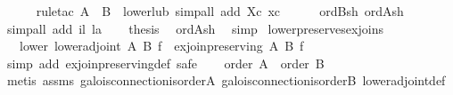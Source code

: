 \begin{isabellebody}
\ \ \ \ \isamarkupfalse%
\ {}rule{}tac\ {}A\ {}\ {}B{}{}\ \ lower{}lub{}\ simp{}all\ add{}\ Xc\ xc{}\isanewline
\ \ \ \ \isamarkupfalse%
\ ord{}Bsh\ ord{}Ash\ \isamarkupfalse%
\ {}simp{}all\ add{}\ il\ la{}\isanewline
\isanewline
\ \ \isamarkupfalse%
\ {}thesis\ \isamarkupfalse%
\ ord{}Ash\ \isamarkupfalse%
\ simp\isanewline
{}\isamarkupfalse%
%
\endisatagproof
{\isafoldproof}%
%
\isadelimproof
\isanewline
%
\endisadelimproof
\isanewline
{}\isamarkupfalse%
\ lower{}preserves{}ex{}joins{}\isanewline
\ \ \ lower{}\ {}lower{}adjoint\ A\ B\ f{}\ \ {}ex{}join{}preserving\ A\ B\ f{}\isanewline
%
\isadelimproof
%
\endisadelimproof
%
\isatagproof
{}\isamarkupfalse%
\ {}simp\ add{}\ ex{}join{}preserving{}def{}\ safe{}\isanewline
\ \ \isamarkupfalse%
\ {}order\ A{}\ \ {}order\ B{}\isanewline
\ \ \ \ \isamarkupfalse%
\ {}metis\ assms\ galois{}connection{}is{}order{}A\ galois{}connection{}is{}order{}B\ lower{}adjoint{}def{}{}\isanewline

\end{isabellebody}
